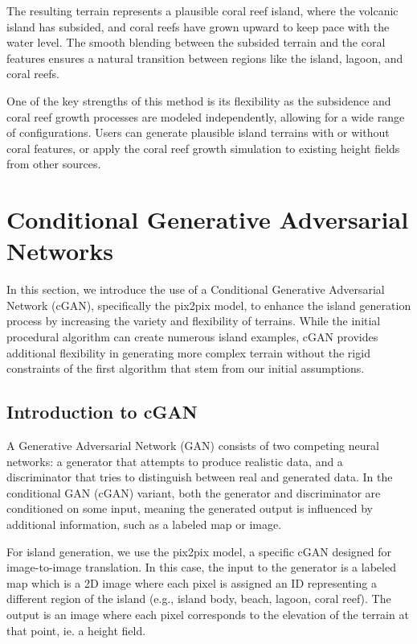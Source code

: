 The resulting terrain represents a plausible coral reef island, where the volcanic island has subsided, and coral reefs have grown upward to keep pace with the water level. The smooth blending between the subsided terrain and the coral features ensures a natural transition between regions like the island, lagoon, and coral reefs.

One of the key strengths of this method is its flexibility as the subsidence and coral reef growth processes are modeled independently, allowing for a wide range of configurations. Users can generate plausible island terrains with or without coral features, or apply the coral reef growth simulation to existing height fields from other sources.





\section{Conditional Generative Adversarial Networks}

In this section, we introduce the use of a Conditional Generative Adversarial Network (cGAN), specifically the pix2pix model, to enhance the island generation process by increasing the variety and flexibility of terrains. While the initial procedural algorithm can create numerous island examples, cGAN provides additional flexibility in generating more complex terrain without the rigid constraints of the first algorithm that stem from our initial assumptions.

\subsection{Introduction to cGAN}

A Generative Adversarial Network (GAN) consists of two competing neural networks: a generator that attempts to produce realistic data, and a discriminator that tries to distinguish between real and generated data. In the conditional GAN (cGAN) variant, both the generator and discriminator are conditioned on some input, meaning the generated output is influenced by additional information, such as a labeled map or image.

For island generation, we use the pix2pix model, a specific cGAN designed for image-to-image translation. In this case, the input to the generator is a labeled map which is a 2D image where each pixel is assigned an ID representing a different region of the island (e.g., island body, beach, lagoon, coral reef). The output is an image where each pixel corresponds to the elevation of the terrain at that point, ie. a height field.

